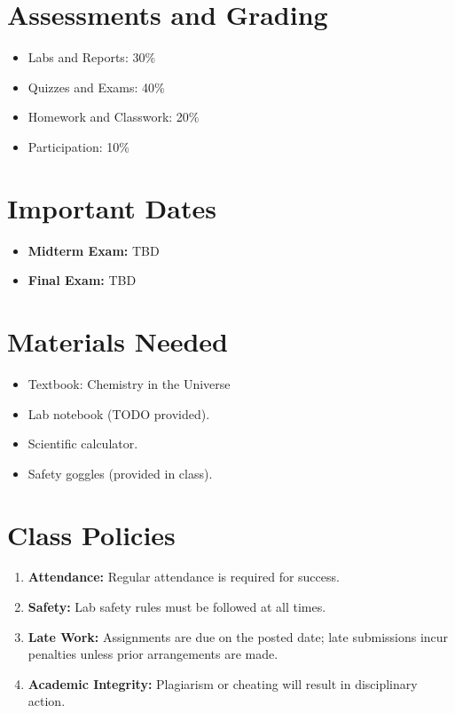 \documentclass[11pt]{article}
\begin{document}
\section{Assessments and Grading}
\label{sec:org1f4246f}

\begin{itemize}
\item Labs and Reports: 30\%
\item Quizzes and Exams: 40\%
\item Homework and Classwork: 20\%
\item Participation: 10\%
\end{itemize}
\section{Important Dates}
\label{sec:org031019f}

\begin{itemize}
\item \textbf{Midterm Exam:} TBD
\item \textbf{Final Exam:} TBD
\end{itemize}
\section{Materials Needed}
\label{sec:org0ecd7b5}

\begin{itemize}
\item Textbook: Chemistry in the Universe
\item Lab notebook (TODO provided).
\item Scientific calculator.
\item Safety goggles (provided in class).
\end{itemize}
\section{Class Policies}
\label{sec:orgdd2dcdb}

\begin{enumerate}
\item \textbf{Attendance:} Regular attendance is required for success.
\item \textbf{Safety:} Lab safety rules must be followed at all times.
\item \textbf{Late Work:} Assignments are due on the posted date; late submissions incur penalties unless prior arrangements are made.
\item \textbf{Academic Integrity:} Plagiarism or cheating will result in disciplinary action.
\end{enumerate}
\end{document}
